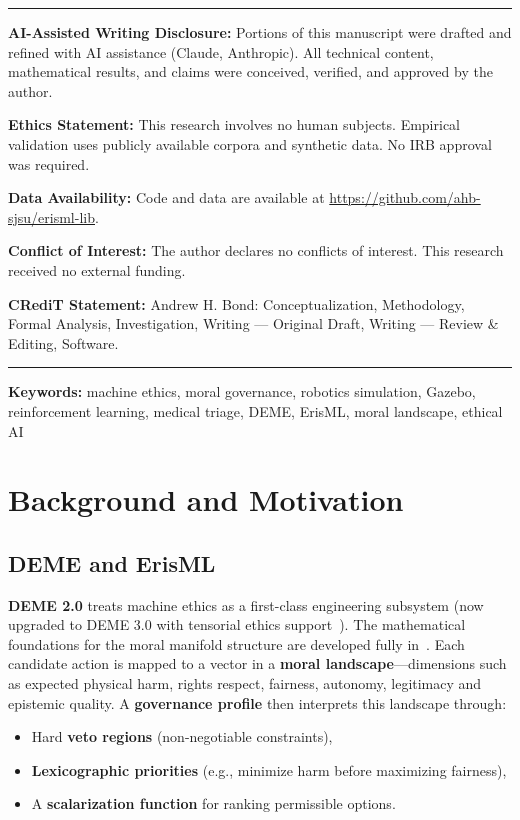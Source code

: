 \documentclass[11pt]{article}
\begin{document}
\begin{titlepage}
\noindent\rule{\linewidth}{0.4pt}
\small
\noindent\textbf{AI-Assisted Writing Disclosure:} Portions of this manuscript were drafted and refined with AI assistance (Claude, Anthropic). All technical content, mathematical results, and claims were conceived, verified, and approved by the author.

\noindent\textbf{Ethics Statement:} This research involves no human subjects. Empirical validation uses publicly available corpora and synthetic data. No IRB approval was required.

\noindent\textbf{Data Availability:} Code and data are available at \url{https://github.com/ahb-sjsu/erisml-lib}.

\noindent\textbf{Conflict of Interest:} The author declares no conflicts of interest. This research received no external funding.

\noindent\textbf{CRediT Statement:} Andrew H. Bond: Conceptualization, Methodology, Formal Analysis, Investigation, Writing --- Original Draft, Writing --- Review \& Editing, Software.
\noindent\rule{\linewidth}{0.4pt}
\normalsize

\end{titlepage}

\noindent\textbf{Keywords:} machine ethics, moral governance, robotics simulation, Gazebo, reinforcement learning, medical triage, DEME, ErisML, moral landscape, ethical AI

\section{Background and Motivation}

\subsection{DEME and ErisML}

\textbf{DEME 2.0} treats machine ethics as a first-class engineering subsystem (now upgraded to DEME 3.0 with tensorial ethics support~\cite{bond2026erisml}). The mathematical foundations for the moral manifold structure are developed fully in~\cite{bond2026ge}. Each candidate action is mapped to a vector in a \textbf{moral landscape}---dimensions such as expected physical harm, rights respect, fairness, autonomy, legitimacy and epistemic quality. A \textbf{governance profile} then interprets this landscape through:

\begin{itemize}
  \item Hard \textbf{veto regions} (non-negotiable constraints),
  \item \textbf{Lexicographic priorities} (e.g., minimize harm before maximizing fairness),
  \item A \textbf{scalarization function} for ranking permissible options.
\end{itemize}
\end{document}
